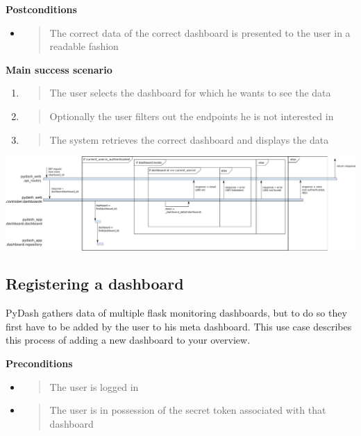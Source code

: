\textbf{Postconditions}

\begin{itemize}
\item
  \begin{quote}
  The correct data of the correct dashboard is presented to the user in
  a readable fashion
  \end{quote}
\end{itemize}

\textbf{Main success scenario}

\begin{enumerate}
\def\labelenumi{\arabic{enumi}.}
\item
  \begin{quote}
  The user selects the dashboard for which he wants to see the data
  \end{quote}
\item
  \begin{quote}
  Optionally the user filters out the endpoints he is not interested in
  \end{quote}
\item
  \begin{quote}
  The system retrieves the correct dashboard and displays the data
  \end{quote}
\end{enumerate}

\includegraphics[width=\pagewidth]{media/image30.png}

\hypertarget{registering-a-dashboard}{%
\subsection{Registering a dashboard}\label{registering-a-dashboard}}

PyDash gathers data of multiple flask monitoring dashboards, but to do
so they first have to be added by the user to his meta dashboard. This
use case describes this process of adding a new dashboard to your
overview.

\textbf{Preconditions}

\begin{itemize}
\item
  \begin{quote}
  The user is logged in
  \end{quote}
\item
  \begin{quote}
  The user is in possession of the secret token associated with that
  dashboard
  \end{quote}
\end{itemize}

